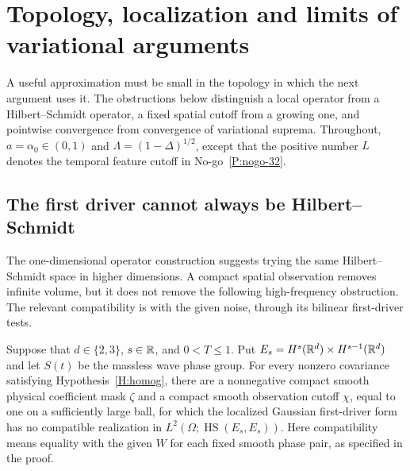 \section{Topology, localization and limits of variational arguments}
\label{S:nogo-topology}

A useful approximation must be small in the topology in which the next
argument uses it. The obstructions below distinguish a local operator from a
Hilbert--Schmidt operator, a fixed spatial cutoff from a growing one, and
pointwise convergence from convergence of variational suprema. Throughout,
$a=\alpha_0\in(0,1)$ and $\Lambda=(1-\Delta)^{1/2}$, except that the positive
number $L$ denotes the temporal feature cutoff in No-go~\ref{P:nogo-32}.

\subsection{The first driver cannot always be Hilbert--Schmidt}
\label{S:nogo-21}

The one-dimensional operator construction suggests trying the same
Hilbert--Schmidt space in higher dimensions. A compact spatial observation
removes infinite volume, but it does not remove the following high-frequency
obstruction. The relevant compatibility is with the given noise, through its
bilinear first-driver tests.

\setcounter{nogo}{20}
\begin{nogo}
  \label{P:nogo-21}
  Suppose that $d\in\{2,3\}$, $s\in\mathbb{R}$, and $0<T\le1$. Put
  $E_s=H^s(\mathbb{R}^d)\times H^{s-1}(\mathbb{R}^d)$ and let $S(t)$ be the massless wave
  phase group. For every nonzero covariance satisfying Hypothesis~\ref{H:homog},
  there are a nonnegative compact smooth physical coefficient mask $\zeta$ and
  a compact smooth observation cutoff $\chi$, equal to one on a sufficiently
  large ball, for which the localized Gaussian first-driver form has no
  compatible realization in $L^2(\Omega;\operatorname{HS}(E_s,E_s))$.
  Here compatibility means equality with the given $W$ for each fixed smooth
  phase pair, as specified in the proof.
\end{nogo}


